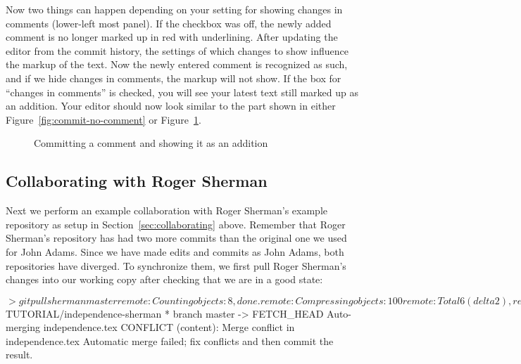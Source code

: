 Now two things can happen depending on your setting for showing changes in comments (lower-left most panel).  If the checkbox was off, the newly added comment is no longer marked up in red with underlining.  After updating the editor from the commit history, the settings of which changes to show influence the markup of the text.  Now the newly entered comment is recognized as such, and if we hide changes in comments, the markup will not show.  If the box for ``changes in comments'' is checked, you will see your latest text still marked up as an addition.  Your editor should now look similar to the part shown in either Figure~\ref{fig:commit-no-comment} or Figure~\ref{fig:commit-comment}.
\begin{figure}
\centering
  \begin{minipage}[t]{0.48\linewidth}
  \centering
  \caption{Committing a comment but not showing it as an addition} \label{fig:commit-no-comment}
  \end{minipage}%
\hspace{0.04\linewidth}%
  \begin{minipage}[t]{0.48\linewidth}
  \centering
  \caption{Committing a comment and showing it as an addition} \label{fig:commit-comment}
  \end{minipage}  
\end{figure}

\subsection{Collaborating with Roger Sherman} \label{sec:tutorial-git:collab}

Next we perform an example collaboration with Roger Sherman's example repository as setup in Section~\ref{sec:collaborating} above. Remember that Roger Sherman's repository has had two more commits than the original one we used for John Adams.  Since we have made edits and commits as John Adams, both repositories have diverged.  To synchronize them, we first pull Roger Sherman's changes into our working copy after checking that we are in a good state:

\begin{CodeVerbatim}
$> git pull sherman master
remote: Counting objects: 8, done.
remote: Compressing objects: 100%
remote: Total 6 (delta 2), reused 5 (delta 1)
Unpacking objects: 100%
From $TUTORIAL/independence-sherman
 * branch            master     -> FETCH_HEAD
Auto-merging independence.tex
CONFLICT (content): Merge conflict in independence.tex
Automatic merge failed; fix conflicts and then commit the result.
\end{CodeVerbatim}

